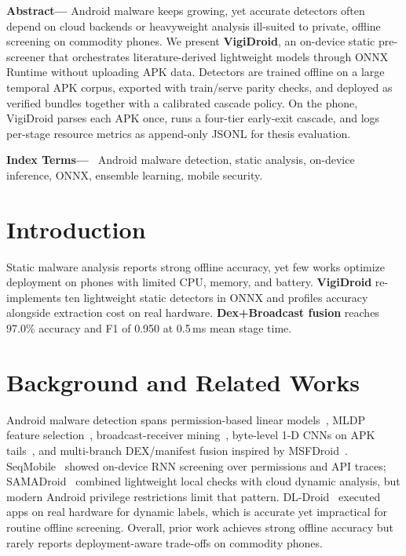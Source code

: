 \documentclass[conference]{IEEEtran}
\begin{document}
	\noindent\begin{minipage}[t]{0.485\textwidth}
		\footnotesize
		\noindent\textbf{Abstract---}\ignorespaces
		Android malware keeps growing, yet accurate detectors often depend on cloud backends or heavyweight analysis ill-suited to private, offline screening on commodity phones.
		We present \textbf{VigiDroid}, an on-device static pre-screener that orchestrates literature-derived lightweight models through ONNX Runtime without uploading APK data.
		Detectors are trained offline on a large temporal APK corpus, exported with train/serve parity checks, and deployed as verified bundles together with a calibrated cascade policy.
		On the phone, VigiDroid parses each APK once, runs a four-tier early-exit cascade, and logs per-stage resource metrics as append-only JSONL for thesis evaluation.
		\par\vspace{0.35em}
		\noindent\textbf{Index Terms---}\ %
		Android malware detection, static analysis, on-device inference, ONNX, ensemble learning, mobile security.
		\par\vspace{0.25em}
		
		\section{Introduction}
		Static malware analysis reports strong offline accuracy, yet few works optimize deployment on phones with limited CPU, memory, and battery.
		\textbf{VigiDroid} re-implements ten lightweight static detectors in ONNX and profiles accuracy alongside extraction cost on real hardware.
		\textbf{Dex+Broadcast fusion} reaches 97.0\% accuracy and F1 of 0.950 at 0.5\,ms mean stage time.
		\section{Background and Related Works}
		Android malware detection spans permission-based linear models~\cite{linregdroid}, MLDP feature selection~\cite{mldp}, broadcast-receiver mining~\cite{broadcast}, byte-level 1-D CNNs on APK tails~\cite{bytecnn}, and multi-branch DEX/manifest fusion inspired by MSFDroid~\cite{msfdroid}.
		SeqMobile~\cite{seqmobile} showed on-device RNN screening over permissions and API traces;
		SAMADroid~\cite{samadroid} combined lightweight local checks with cloud dynamic analysis, but modern Android privilege restrictions limit that pattern.
		DL-Droid~\cite{dldroid} executed apps on real hardware for dynamic labels, which is accurate yet impractical for routine offline screening.
		Overall, prior work achieves strong offline accuracy but rarely reports deployment-aware trade-offs on commodity phones.

\end{minipage}
\end{document}
